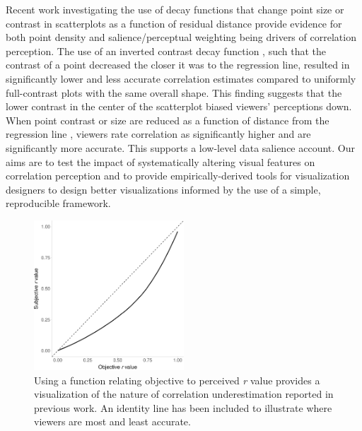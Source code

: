 \documentclass[manuscript, review, anonymous, screen]{acmart}
\begin{document}
Recent work investigating the use of decay functions that change point
size or contrast in scatterplots as a function of residual distance
provide evidence for both point density and salience/perceptual
weighting being drivers of correlation perception. The use of an
inverted contrast decay function \citep{strain_2023}, such that the
contrast of a point decreased the closer it was to the regression line,
resulted in significantly lower and less accurate correlation estimates
compared to uniformly full-contrast plots with the same overall shape.
This finding suggests that the lower contrast in the center of the
scatterplot biased viewers' perceptions down. When point contrast or
size are reduced as a function of distance from the regression line
\citep{strain_2023, strain_2023b}, viewers rate correlation as
significantly higher and are significantly more accurate. This supports
a low-level data salience account. Our aims are to test the impact of
systematically altering visual features on correlation perception and to
provide empirically-derived tools for visualization designers to design
better visualizations informed by the use of a simple, reproducible
framework.

\begin{figure}

\includegraphics[width=0.5\textwidth,height=\textheight]{size_and_contrast_files/figure-pdf/fig-underestimation-curve-1.pdf} \hfill{}

\caption{\label{fig-underestimation-curve}Using a function relating
objective to perceived \emph{r} value \citep{rensink_2017} provides a
visualization of the nature of correlation underestimation reported in
previous work. An identity line has been included to illustrate where
viewers are most and least accurate.}
\end{figure}
\end{document}
